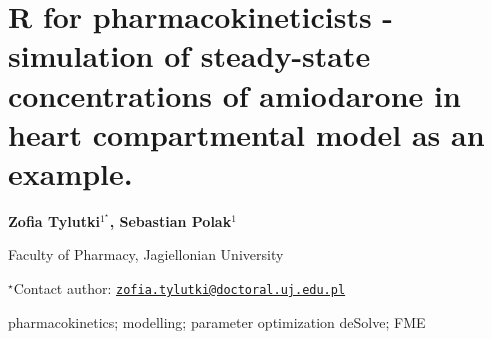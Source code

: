 \documentclass[\main/boa.tex]{subfiles}
\begin{document}
\section{R for pharmacokineticists - simulation of steady-state concentrations of
amiodarone in heart compartmental model as an example.}

\begin{center}
  {\bf {} Zofia Tylutki$^{1^\star}$,  Sebastian Polak$^{1}$}
\end{center}

\vskip 0.3cm

\begin{affiliations}
\begin{enumerate}
\begin{minipage}{0.915\textwidth}
\centering
\item Faculty of Pharmacy, Jagiellonian University \\[-2pt]
\end{minipage}
\end{enumerate}
$^\star$Contact author: \href{mailto:zofia.tylutki@doctoral.uj.edu.pl}{\nolinkurl{zofia.tylutki@doctoral.uj.edu.pl}}\\
\end{affiliations}

\vskip 0.5cm

\begin{minipage}{0.915\textwidth}
\keywords pharmacokinetics; modelling; parameter optimization
\packages {} deSolve;  FME
\end{minipage}

\vskip 0.8cm
\end{document}
